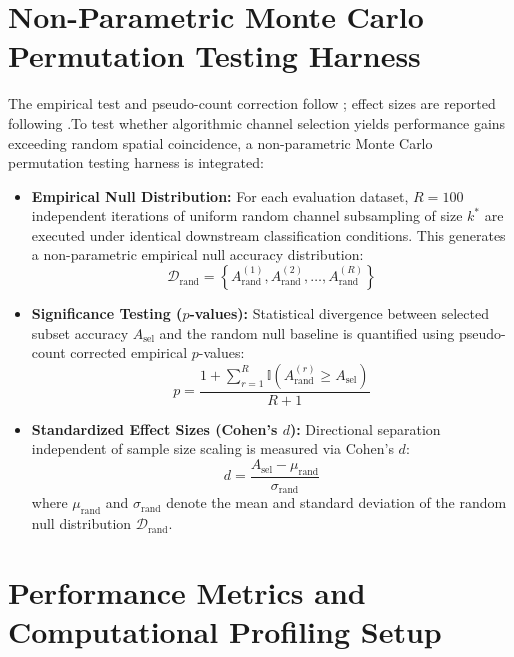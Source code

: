 \section{Non-Parametric Monte Carlo Permutation Testing Harness}
\label{sec:monte_carlo}

\noindent
The empirical test and pseudo-count correction follow
\citet{north2002permutation,phipson2010permutation}; effect sizes are
reported following \citet{cohen1988power,lakens2013effect}.To test whether algorithmic channel selection yields performance gains exceeding random spatial coincidence, a non-parametric Monte Carlo permutation testing harness is integrated:

\begin{itemize}
    \item \textbf{Empirical Null Distribution:} For each evaluation dataset, $R = 100$ independent iterations of uniform random channel subsampling of size $k^*$ are executed under identical downstream classification conditions. This generates a non-parametric empirical null accuracy distribution:
    \begin{equation}
        \mathcal{D}_{\text{rand}} = \left\{ A_{\text{rand}}^{(1)}, A_{\text{rand}}^{(2)}, \dots, A_{\text{rand}}^{(R)} \right\}
    \end{equation}
    \item \textbf{Significance Testing ($p$-values):} Statistical divergence between selected subset accuracy $A_{\text{sel}}$ and the random null baseline is quantified using pseudo-count corrected empirical $p$-values:
    \begin{equation}
        p = \frac{1 + \sum_{r=1}^R \mathbb{I}\left( A_{\text{rand}}^{(r)} \ge A_{\text{sel}} \right)}{R + 1}
    \end{equation}
    \item \textbf{Standardized Effect Sizes (Cohen's $d$):} Directional separation independent of sample size scaling is measured via Cohen's $d$:
    \begin{equation}
        d = \frac{A_{\text{sel}} - \mu_{\text{rand}}}{\sigma_{\text{rand}}}
    \end{equation}
    where $\mu_{\text{rand}}$ and $\sigma_{\text{rand}}$ denote the mean and standard deviation of the random null distribution $\mathcal{D}_{\text{rand}}$.
\end{itemize}

\section{Performance Metrics and Computational Profiling Setup}
\label{sec:profiling_setup}

